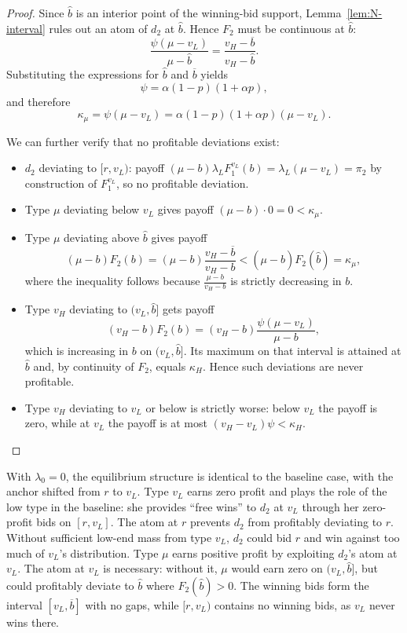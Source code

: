 \begin{proof}
\noindent Since $\hat{b}$ is an interior point of the winning-bid support, Lemma~\ref{lem:N-interval} rules out an atom of $d_2$ at $\hat{b}$. Hence $F_2$ must be continuous at $\hat{b}$:
\[
\frac{\psi(\mu - v_L)}{\mu - \hat{b}} = \frac{v_H - \overline{b}}{v_H - \hat{b}}.
\]
Substituting the expressions for $\hat{b}$ and $\overline{b}$ yields
\[
\psi = \alpha(1-p)(1+\alpha p),
\]
and therefore
\[
\kappa_{\mu} = \psi(\mu - v_L) = \alpha(1-p)(1+\alpha p)(\mu - v_L).
\]

\noindent We can further verify that no profitable deviations exist:
\begin{itemize}
    \item $d_2$ deviating to $[r, v_L)$: payoff $(\mu - b)\lambda_L F_1^{v_L}(b) = \lambda_L(\mu - v_L) = \pi_2$ by construction of $F_1^{v_L}$, so no profitable deviation.
    \item Type $\mu$ deviating below $v_L$ gives payoff $(\mu - b) \cdot 0 = 0 < \kappa_{\mu}$.
    \item Type $\mu$ deviating above $\hat{b}$ gives payoff
    \[
    (\mu - b)F_2(b) = (\mu - b)\frac{v_H - \overline{b}}{v_H - b} < (\mu - \hat{b})F_2(\hat{b}) = \kappa_{\mu},
    \]
    where the inequality follows because $\frac{\mu-b}{v_H-b}$ is strictly decreasing in $b$.
    \item Type $v_H$ deviating to $(v_L, \hat{b}]$ gets payoff
    \[
    (v_H - b)F_2(b) = (v_H - b)\frac{\psi(\mu - v_L)}{\mu - b},
    \]
    which is increasing in $b$ on $(v_L,\hat{b}]$. Its maximum on that interval is attained at $\hat{b}$ and, by continuity of $F_2$, equals $\kappa_H$. Hence such deviations are never profitable.
    \item Type $v_H$ deviating to $v_L$ or below is strictly worse: below $v_L$ the payoff is zero, while at $v_L$ the payoff is at most $(v_H - v_L)\psi < \kappa_H$.
\end{itemize}
\end{proof}

\begin{rem}
    With $\lambda_0 = 0$, the equilibrium structure is identical to the baseline case, with the anchor shifted from $r$ to $v_L$. Type $v_L$ earns zero profit and plays the role of the low type in the baseline: she provides ``free wins'' to $d_2$ at $v_L$ through her zero-profit bids on $[r, v_L]$. The atom at $r$ prevents $d_2$ from profitably deviating to $r$. Without sufficient low-end mass from type $v_L$, $d_2$ could bid $r$ and win against too much of $v_L$'s distribution. Type $\mu$ earns positive profit by exploiting $d_2$'s atom at $v_L$. The atom at $v_L$ is necessary: without it, $\mu$ would earn zero on $(v_L, \hat{b}]$, but could profitably deviate to $\hat{b}$ where $F_2(\hat{b}) > 0$. The winning bids form the interval $[v_L, \overline{b}]$ with no gaps, while $[r, v_L)$ contains no winning bids, as $v_L$ never wins there.
\end{rem}

